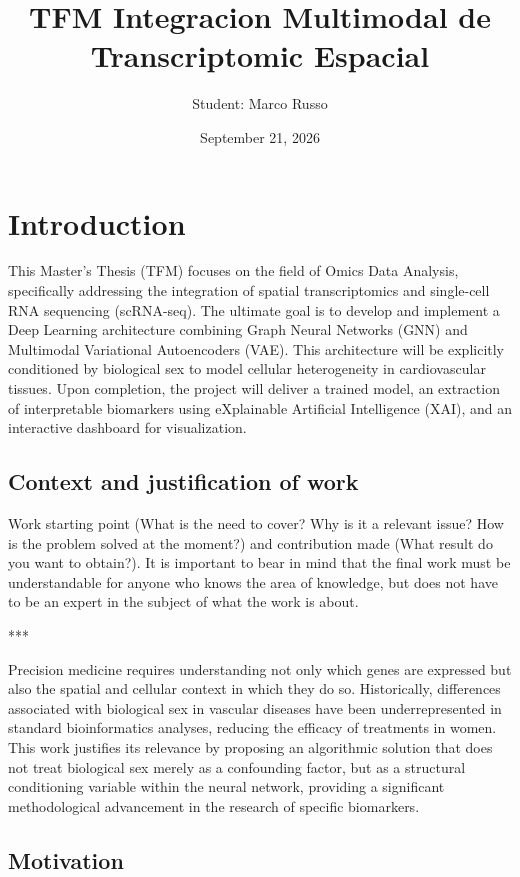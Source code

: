 \documentclass[ENG,BIB]{TFUOC}%
\title{TFM Integracion Multimodal de Transcriptomic Espacial}
\author{Student: Marco Russo}
\date{September 21, 2026}
\begin{document}
\estructura

\tableofcontents

\listoffigures

\listoftables




\chapter{Introduction}

This Master's Thesis (TFM) focuses on the field of Omics Data Analysis, specifically addressing the integration of spatial transcriptomics and single-cell RNA sequencing (scRNA-seq). The ultimate goal is to develop and implement a Deep Learning architecture combining Graph Neural Networks (GNN) and Multimodal Variational Autoencoders (VAE). This architecture will be explicitly conditioned by biological sex to model cellular heterogeneity in cardiovascular tissues. Upon completion, the project will deliver a trained model, an extraction of interpretable biomarkers using eXplainable Artificial Intelligence (XAI), and an interactive dashboard for visualization.

\section{Context and justification of work}

Work starting point (What is the need to cover? Why is it a relevant issue? How is the problem solved at the moment?) and contribution made (What result do you want to obtain?).
It is important to bear in mind that the final work must be understandable for anyone who knows the area of knowledge, but does not have to be an expert in the subject of what the work is about.

***

Precision medicine requires understanding not only which genes are expressed but also the spatial and cellular context in which they do so. Historically, differences associated with biological sex in vascular diseases have been underrepresented in standard bioinformatics analyses, reducing the efficacy of treatments in women. This work justifies its relevance by proposing an algorithmic solution that does not treat biological sex merely as a confounding factor, but as a structural conditioning variable within the neural network, providing a significant methodological advancement in the research of specific biomarkers.


\section{Motivation}
\end{document}
